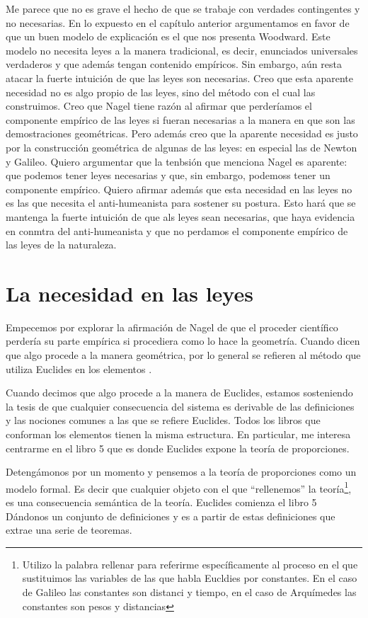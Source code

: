 Me parece que no es grave el hecho de que se trabaje con verdades contingentes y no necesarias. En lo expuesto en el capítulo anterior argumentamos en favor de que un buen modelo de explicación es el que nos presenta Woodward. Este modelo no necesita leyes a la manera tradicional, es decir, enunciados universales verdaderos y que además tengan contenido empíricos. Sin embargo, aún resta atacar la fuerte intuición de que las leyes son necesarias. Creo que esta aparente necesidad no es algo propio de las leyes, sino del método con el cual las construimos. Creo que Nagel tiene razón al afirmar que perderíamos el componente empírico de las leyes si fueran necesarias a la manera en que son las demostraciones geométricas. Pero además creo que la aparente necesidad es justo por la construcción geométrica de algunas de las leyes: en especial las de Newton y Galileo. Quiero argumentar que la tenbsión que menciona Nagel es aparente: que podemos tener leyes necesarias y que, sin embargo, podemoss tener un componente empírico. Quiero afirmar además que esta necesidad en las leyes no es las que necesita el anti-humeanista para sostener su postura. Esto hará que se mantenga la fuerte intuición de que als leyes sean necesarias, que haya evidencia en conmtra del anti-humeanista y que no perdamos el componente empírico de las leyes de la naturaleza.

\section{La necesidad en las leyes}

\noindent Empecemos por explorar la afirmación de Nagel de que el proceder científico perdería su parte empírica si procediera como lo hace la geometría. Cuando dicen que algo procede a la manera geométrica, por lo general se refieren al método que utiliza Euclides en los elementos \cite{Euclid2008}.

Cuando decimos que algo procede a la manera de Euclides, estamos sosteniendo la tesis de que cualquier consecuencia del sistema es derivable de las definiciones y las nociones comunes a las que se refiere Euclides. Todos los libros que conforman los elementos tienen la misma estructura. En particular, me interesa centrarme en el libro 5 que es donde Euclides expone la teoría de proporciones.

Detengámonos por un momento y pensemos a la teoría de proporciones como un modelo formal. Es decir que cualquier objeto con el que ``rellenemos'' la teoría\footnote{Utilizo la palabra rellenar para referirme específicamente al proceso en el que sustituimos las variables de las que habla Eucldies por constantes. En el caso de Galileo las constantes son distanci y tiempo, en el caso de Arquímedes las constantes son pesos y distancias}, es una consecuencia semántica de la teoría. Euclides comienza el libro 5 Dándonos un conjunto de definiciones y es a partir de estas definiciones que extrae una serie de teoremas.

